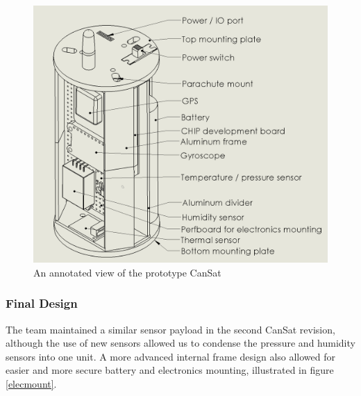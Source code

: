 \documentclass[]{report}
\begin{document}
\begin{figure}[h]
	\hfill\includegraphics[scale=0.2]{annotated_cansat.png}\hspace*{\fill}
	\caption{An annotated view of the prototype CanSat}
	\label{anoldcan}
\end{figure}

\subsubsection{Final Design}
The team maintained a similar sensor payload in the second CanSat revision, although the use of new sensors allowed us to condense the pressure and humidity sensors into one unit. A more advanced internal frame design also allowed for easier and more secure battery and electronics mounting, illustrated in figure \ref{elecmount}.
\end{document}
